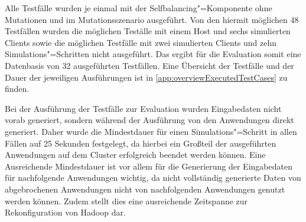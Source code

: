 Alle Testfälle wurden je einmal mit der Selfbalancing"=Komponente ohne Mutationen und im Mutationsszenario ausgeführt.
Von den hiermit möglichen 48 Testfällen wurden die möglichen Teställe mit einem Host und sechs simulierten Clients sowie die möglichen Testfälle mit zwei simulierten Clients und zehn Simulations"=Schritten nicht ausgeführt.
Das ergibt für die Evaluation somit eine Datenbasis von 32 ausgeführten Testfällen.
Eine Übersicht der Testfälle und der Dauer der jeweiligen Ausführungen ist in \autoref{app:overviewExecutedTestCases} zu finden.

Bei der Ausführung der Testfälle zur Evaluation wurden Eingabedaten nicht vorab generiert, sondern während der Ausführung von den Anwendungen direkt generiert.
Daher wurde die Mindestdauer für einen Simulations"=Schritt in allen Fällen auf 25 Sekunden festgelegt, da hierbei ein Großteil der ausgeführten Anwendungen auf dem Cluster erfolgreich beendet werden können.
Eine Ausreichende Mindestdauer ist vor allem für die Generierung der Eingabedaten für nachfolgende Anwendungen wichtig, da nicht vollständig generierte Daten von abgebrochenen Anwendungen nicht von nachfolgenden Anwendungen genutzt werden können.
Zudem stellt dies eine ausreichende Zeitspanne zur Rekonfiguration von Hadoop dar.

